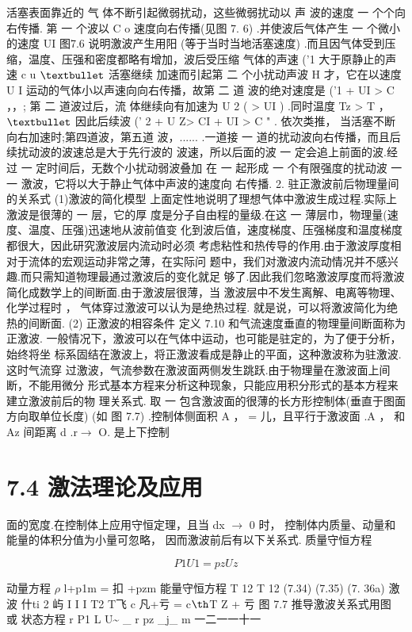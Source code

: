 活塞表面靠近的 气 体不断引起微弱扰动，这些微弱扰动以 声 波的速度 一 个个向右传播. 第 一 个波以 C o 速度向右传播(见图 7. 6) .并使波后气体产生 一 个微小的速度 UI 图7.6 说明激波产生用阳 (等于当时当地活塞速度) .而且因气体受到压 缩，温度、压强和密度都略有增加，波后受压缩 气体的声速 ('1 大于原静止的声速 c u ${\rm •}$ 活塞继续 加速而引起第 二 个小扰动声波 H 才，它在以速度 U I 运动的气体小以声速向向右传播，故第 二 道 波的绝对速度是 ('1 + UI > C ，，; 第 二 道波过后，流 体继续向有加速为 U 2 ( > UI ) .同时温度 Tz > T ， ${\rm •}$ 因此后续波 (' 2 + U Z> CI + UI > C " . 依次类推， 当活塞不断向右加速时;第四道波，第五道 波，...... .一道接 一 道的扰动波向右传播，而且后续扰动波的波速总是大于先行波的 波速，所以后面的波 一 定会追上前面的波.经过 一 定时间后，无数个小扰动弱波叠加 在 一 起形成 一 个有限强度的扰动波 一一 激波，它将以大于静止气体中声波的速度向 右传播. 2. 驻正激波前后物理量间的关系式 (1)激波的简化模型 上面定性地说明了理想气体中激波生成过程.实际上激波是很薄的 一 层，它的厚 度是分子自由程的量级.在这 一 薄层巾，物理量(速度、温度、压强)迅速地从波前值变 化到波后值，速度梯度、压强梯度和温度梯度都很大，因此研究激波层内流动时必须 考虑粘性和热传导的作用.由于激波厚度相对于流体的宏观运动非常之薄，在实际问 题中，我们对激波内流动情况并不感兴趣.而只需知道物理最通过激波后的变化就足 够了.因此我们忽略激波厚度而将激波简化成数学上的间断面.由于激波层很薄，当 激波层中不发生离解、电离等物理、化学过程时 ， 气体穿过激波可以认为是绝热过程. 就是说，可以将激波简化为绝热的间断面. (2) 正激波的相容条件 定义 7.10 和气流速度垂直的物理量间断面称为正激波. 一般情况下，激波可以在气体中运动，也可能是驻定的，为了便于分析，始终将坐 标系固结在激波上，将正激波看成是静止的平面，这种激波称为驻激波.这时气流穿 过激波，气流参数在激波面两侧发生跳跃.由于物理量在激波面上间断，不能用微分 形式基本方程来分析这种现象，只能应用积分形式的基本方程来建立激波前后的物 理关系式. 取 一 包含激波面的很薄的长方形控制体(垂直于图面方向取单位长度) (如 图 7.7) .控制体侧面积 A ， = 儿，且平行于激波面 .A ， 和 Az 间距离 d .r$\rightarrow$ O. 是上下控制

\section*{7.4  激法理论及应用}

面的宽度.在控制体上应用守恒定理，且当 dx $\rightarrow$ 0 时， 控制体内质量、动量和能量的体积分值为小量可忽略， 因而激波前后有以下关系式. 质量守恒方程

\[P1 U1 = pzUz\]

动量方程 $\rho$ l+p1m = 扣 +pzm 能量守恒方程 T 12 T 12 (7.34) (7.35) (7. 36a) 激 波 什ti 2 屿 I I I T2 T飞 c 凡+亏 = c${\rm þ}$T Z + 亏 图 7.7 推导激波关系式用图 或 状态方程 r P1 L U\textasciitilde{} \_ r pz \_j\_ m 一二一一十一

